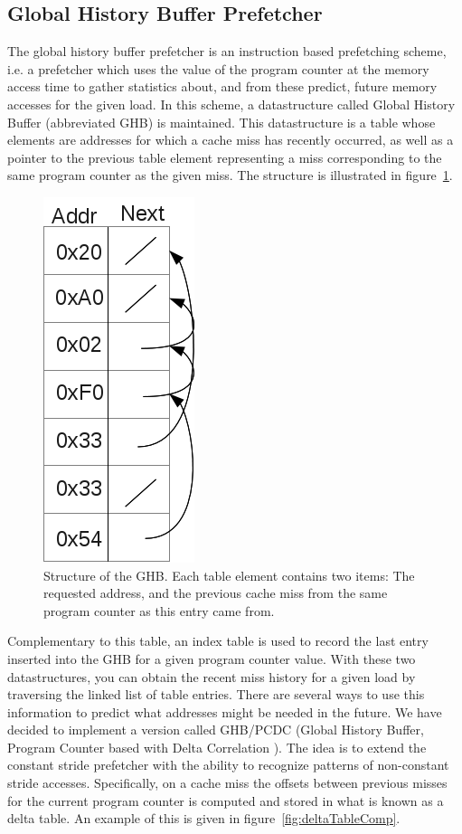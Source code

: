 \subsection{Global History Buffer Prefetcher}
\label{sec:ghbPcdcPrefetcher}

The global history buffer prefetcher is an instruction based
prefetching scheme, i.e. a prefetcher which uses the value of the
program counter at the memory access time to gather statistics about,
and from these predict, future memory accesses for the given load. In
this scheme, a datastructure called Global History Buffer (abbreviated
GHB) is maintained. This datastructure is a table whose elements are
addresses for which a cache miss has recently occurred, as well as a
pointer to the previous table element representing a miss
corresponding to the same program counter as the given miss. The
structure is illustrated in figure~\ref{fig:ghbStruct}.

\begin{figure}[ht]
  \centering
  \includegraphics[scale=0.5]{figures/ghb_diag.png}
  \caption{\label{fig:ghbStruct} Structure of the GHB. Each table
    element contains two items: The requested address, and the
    previous cache miss from the same program counter as this entry
    came from.}
\end{figure}

Complementary to this table, an index table is used to record the last
entry inserted into the GHB for a given program counter value. With
these two datastructures, you can obtain the recent miss history for a
given load by traversing the linked list of table entries. There are
several ways to use this information to predict what addresses might
be needed in the future. We have decided to implement a version called
GHB/PCDC (Global History Buffer, Program Counter based with Delta
Correlation \cite{Grannas}). The idea is to extend the constant stride
prefetcher with the ability to recognize patterns of non-constant
stride accesses. Specifically, on a cache miss the offsets between
previous misses for the current program counter is computed and stored
in what is known as a delta table. An example of this is given in
figure~\ref{fig:deltaTableComp}. 

